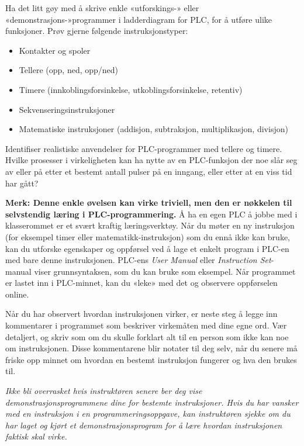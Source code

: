 
Ha det litt gøy med å skrive enkle «utforskings-» eller «demonstrasjons-»programmer i ladderdiagram for PLC, for å utføre ulike funksjoner. Prøv gjerne følgende instruksjonstyper:

\begin{itemize}
\item{} Kontakter og spoler
\item{} Tellere (opp, ned, opp/ned)
\item{} Timere (innkoblingsforsinkelse, utkoblingsforsinkelse, retentiv)
\item{} Sekvenseringsinstruksjoner
\item{} Matematiske instruksjoner (addisjon, subtraksjon, multiplikasjon, divisjon)
\end{itemize}

Identifiser realistiske anvendelser for PLC-programmer med tellere og timere. Hvilke prosesser i virkeligheten kan ha nytte av en PLC-funksjon der noe slår seg av eller på etter et bestemt antall pulser på en inngang, eller etter at en viss tid har gått?

\vskip 10pt

{\bf Merk: Denne enkle øvelsen kan virke triviell, men den er nøkkelen til selvstendig læring i PLC-programmering.} Å ha en egen PLC å jobbe med i klasserommet er et svært kraftig læringsverktøy. Når du møter en ny instruksjon (for eksempel timer eller matematikk-instruksjon) som du ennå ikke kan bruke, kan du utforske egenskaper og oppførsel ved å lage et enkelt program i PLC-en med bare denne instruksjonen. PLC-ens {\it User Manual} eller {\it Instruction Set}-manual viser grunnsyntaksen, som du kan bruke som eksempel. Når programmet er lastet inn i PLC-minnet, kan du «leke» med det og observere oppførselen online.

Når du har observert hvordan instruksjonen virker, er neste steg å legge inn kommentarer i programmet som beskriver virkemåten med dine egne ord. Vær detaljert, og skriv som om du skulle forklart alt til en person som ikke kan noe om instruksjonen. Disse kommentarene blir notater til deg selv, når du senere må friske opp minnet om hvordan en bestemt instruksjon fungerer og hva den brukes til.

\vskip 10pt

{\it Ikke bli overrasket hvis instruktøren senere ber deg vise demonstrasjonsprogrammene dine for bestemte instruksjoner. Hvis du har vansker med en instruksjon i en programmeringsoppgave, kan instruktøren sjekke om du har laget og kjørt et demonstrasjonsprogram for å lære hvordan instruksjonen faktisk skal virke.}


